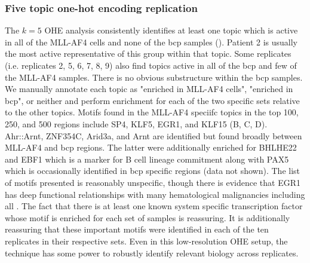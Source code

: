 \subsubsection{Five topic one-hot encoding replication}

The $k=5$ OHE analysis consistently identifies at least one topic which is active in all of the MLL-AF4 cells and none of the \gls{bcp} samples (). Patient 2 is usually the most active representative of this group within that topic. Some replicates (i.e. replicates 2, 5, 6, 7, 8, 9) also find topics active in all of the \gls{bcp} and few of the MLL-AF4 samples. There is no obvious substructure within the \gls{bcp} samples.  We manually annotate each topic as "enriched in MLL-AF4 cells", "enriched in \gls{bcp}", or neither and perform enrichment for each of the two specific sets relative to the other topics.  Motifs found in the MLL-AF4 speciifc topics in the top 100, 250, and 500 regions include SP4, KLF5, EGR1, and KLF15 (B, C, D). Ahr::Arnt, ZNF354C, Arid3a, and Arnt are identified but found broadly between MLL-AF4 and \gls{bcp} regions.  The latter were additionally enriched for BHLHE22 and EBF1 which is a marker for B cell lineage commitment \cite{Infante2013} along with PAX5 which is occasionally identified in \gls{bcp} specific regions (data not shown). The list of motifs presented is reasonably unspecific, though there is evidence that EGR1 has deep functional relationships with many hematological malignancies including \gls{all} \cite{Tian2016}. The fact that there is at least one known system specific transcription factor whose motif is enriched for each set of samples is reassuring.  It is additionally reassuring that these important motifs were identified in each of the ten replicates in their respective sets.  Even in this low-resolution OHE setup, the technique has some power to robustly identify relevant biology across replicates.

